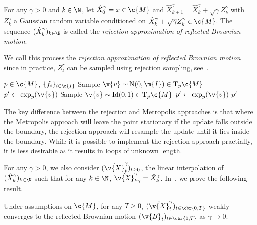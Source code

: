 \begin{definition}
	For any \(\gamma > 0\) and \(k \in \N\), let \(\hat{X}_0^\gamma = x \in \c{M}\) and \(\hat{X}_{k+1}^\gamma = \hat{X}_k^\gamma + \sqrt{\gamma} Z_k^\gamma\) with \(Z_k^\gamma\) a Gaussian random variable conditioned on \(\hat{X}_k^\gamma + \sqrt{\gamma} Z_k^\gamma \in \c{M}\).
	The sequence \((\hat{X}_k^\gamma)_{k \in \N}\) is called the \emph{rejection approximation of reflected Brownian motion}.
\end{definition}
We call this process the \emph{rejection approximation of reflected Brownian motion} since in practice, \(Z_k^\gamma\) can be sampled using rejection sampling, see~.
\begin{algorithm}[H]
	\caption{\emph{Rejection approximation of reflected Brownian motion}}
	\label{alg:rejection_sampling}
	\begin{algorithmic}
		\Require \(p \in \c{M}\), \(\{f_i\}_{i \in \c{I}}\)
		\State Sample \(\v{v} \sim \mathrm{N}(0,\m{I}) \in \mathrm{T}_p\c{M}\)
		\State \(p' \gets \exp_{p}(\v{v})\)
		\State Sample \(\v{v} \sim \mathrm{Id}(0,1) \in \mathrm{T}_p\c{M}\)
		\State \(p' \gets \exp_{p}(\v{v})\)
		\EndWhile
		\Return \(p'\)
	\end{algorithmic}
\end{algorithm}
The key difference between the rejection and Metropolis approaches is that where the Metropolis approach will leave the point stationary if the update falls outside the boundary, the rejection approach will resample the update until it lies inside the boundary.
While it is possible to implement the rejection approach practially, it is less desirable as it results in loops of unknown length.

For any \(\gamma > 0\), we also consider \((\hat{\v{X}}_t^\gamma)_{t \geq 0}\), the linear interpolation of \((\hat{X}^\gamma_k)_{k \in \N}\) such that for any \(k \in \N\), \(\hat{\v{X}}_{k \gamma}^\gamma = \hat{X}_k^\gamma\).
In~, we prove the following result.

\begin{theorem}
	\label{thm:weak_convergence_rejection}
	Under assumptions on \(\c{M}\), for any \(T \geq 0\), \((\hat{\v{X}}_t^\gamma)_{t \in \cbr{0,T}}\) weakly converges to the reflected Brownian motion \((\bar{\v{B}}_t)_{t \in \cbr{0,T}}\) as \(\gamma \to 0\).
\end{theorem}

